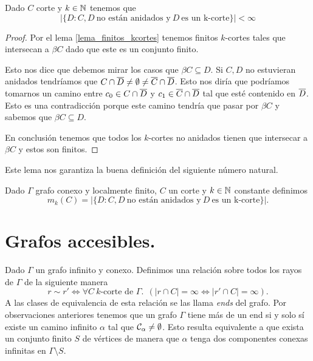 \documentclass[tesis.tex]{subfiles}
\begin{document}
\begin{lema}
	Dado $C$ corte y $k \in \mathbb{N}$ tenemos que 
	\[
	| \{  D : C, D \ \text{no están anidados y} \ D \ \text{es un k-corte}   \} | < \infty
	\]
\end{lema}
\begin{proof}
	Por el lema \ref{lema_finitos_kcortes} tenemos finitos $k$-cortes tales que intersecan a $\beta C$ dado que este es un conjunto finito.
	
	Esto nos dice que debemos mirar los casos que $\beta C \subseteq D$.
	Si $C,D$ no estuvieran anidados tendríamos que $C \cap \overline D \neq \emptyset \neq \overline C \cap \overline D$.
	Esto nos diría que podríamos tomarnos un camino entre $c_0 \in C \cap \overline D$ y $c_1 \in \overline C \cap \overline D$ tal que esté contenido en $\overline D$.
	Esto es una contradicción porque este camino tendría que pasar por $\beta C$ y sabemos que $\beta C \subseteq D$.
	
	En conclusión tenemos que todos los $k$-cortes no anidados tienen que intersecar a $\beta C$ y estos son finitos.
				
\end{proof}

Este lema nos garantiza la buena definición del siguiente número natural.
\begin{deff}
	Dado $\Gamma$ grafo conexo y localmente finito, $C$ un corte y $k \in \mathbb{N}$ constante definimos
	\[
	m_k(C) = | \{  D : C, D \ \text{no están anidados y} \ D \ \text{es un k-corte}   \} |. 
	\]
\end{deff}



\section{Grafos accesibles.}

Dado $\Gamma$ un grafo infinito y conexo.
Definimos una relación sobre todos los rayos de $\Gamma$ de la siguiente manera
\[
r \sim r' \iff \forall C \ \text{$k$-corte de $\Gamma$}. \ \ 
(|r \cap C| = \infty \iff |r' \cap C| = \infty). 
\]
A las clases de equivalencia de esta relación se las llama \emph{ends} del grafo.
Por observaciones anteriores tenemos que un grafo $\Gamma$ tiene más de un end si y solo sí existe un camino infinito $\alpha$ tal que ${\cal C}_{\alpha} \neq \emptyset$.
Esto resulta equivalente a que exista un conjunto finito $S$ de vértices de manera que $\alpha$ tenga dos componentes conexas infinitas en $\Gamma \setminus S$.
\end{document}
